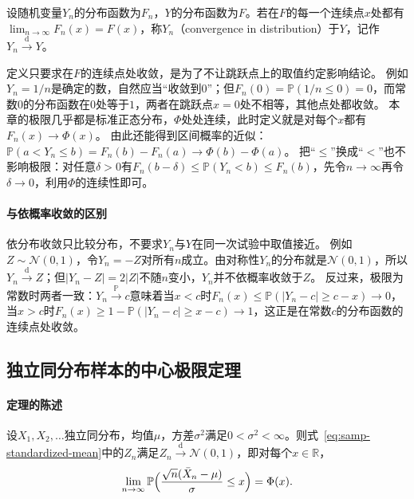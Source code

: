 \begin{definition}[依分布收敛]
\label{def:samp-convergence-in-distribution}
设随机变量$Y_n$的分布函数为$F_n$，$Y$的分布函数为$F$。若在$F$的每一个连续点$x$处都有$\lim_{n\to\infty}F_n(x)=F(x)$，称$Y_n$（convergence in distribution）于$Y$，记作$Y_n\xrightarrow{\mathrm{d}}Y$。
\end{definition}

定义只要求在$F$的连续点处收敛，是为了不让跳跃点上的取值约定影响结论。
例如$Y_n=1/n$是确定的数，自然应当“收敛到$0$”；但$F_n(0)=\mathbb{P}(1/n\leq0)=0$，而常数$0$的分布函数在$0$处等于$1$，两者在跳跃点$x=0$处不相等，其他点处都收敛。
本章的极限几乎都是标准正态分布，$\Phi$处处连续，此时定义就是对每个$x$都有$F_n(x)\to\Phi(x)$。
由此还能得到区间概率的近似：$\mathbb{P}(a<Y_n\leq b)=F_n(b)-F_n(a)\to\Phi(b)-\Phi(a)$。
把“$\leq$”换成“$<$”也不影响极限：对任意$\delta>0$有$F_n(b-\delta)\leq\mathbb{P}(Y_n<b)\leq F_n(b)$，先令$n\to\infty$再令$\delta\to0$，利用$\Phi$的连续性即可。

\paragraph{与依概率收敛的区别}
依分布收敛只比较分布，不要求$Y_n$与$Y$在同一次试验中取值接近。
例如$Z\sim\mathcal N(0,1)$，令$Y_n=-Z$对所有$n$成立。由对称性$Y_n$的分布就是$\mathcal N(0,1)$，所以$Y_n\xrightarrow{\mathrm{d}}Z$；但$|Y_n-Z|=2|Z|$不随$n$变小，$Y_n$并不依概率收敛于$Z$。
反过来，极限为常数时两者一致：$Y_n\xrightarrow{\mathbb{P}}c$意味着当$x<c$时$F_n(x)\leq\mathbb{P}(|Y_n-c|\geq c-x)\to0$，当$x>c$时$F_n(x)\geq1-\mathbb{P}(|Y_n-c|\geq x-c)\to1$，这正是在常数$c$的分布函数的连续点处收敛。

\subsection{独立同分布样本的中心极限定理}

\paragraph{定理的陈述}

\begin{theorem}[中心极限定理]
\label{thm:samp-clt}
设$X_1,X_2,\dots$独立同分布，均值$\mu$，方差$\sigma^2$满足$0<\sigma^2<\infty$。则式~\eqref{eq:samp-standardized-mean}中的$Z_n$满足$Z_n\xrightarrow{\mathrm{d}}\mathcal N(0,1)$，即对每个$x\in\mathbb{R}$，
\[
  \lim_{n\to\infty}\mathbb{P}\Bigl(\frac{\sqrt n(\bar X_n-\mu)}{\sigma}\leq x\Bigr)=\Phi(x).
\]
\end{theorem}

